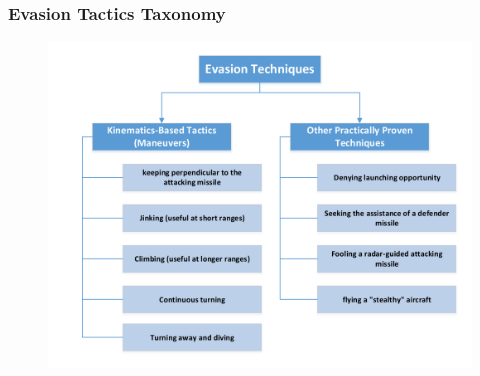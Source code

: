 \documentclass{beamer}
\begin{document}
\begin{frame}
\frametitle{Evasion Tactics Taxonomy}

	\begin{figure}[H]
		\centering
		\includegraphics[scale = 0.50]{fig/Evasion.pdf}
	\end{figure}

\end{frame}
\end{document}

